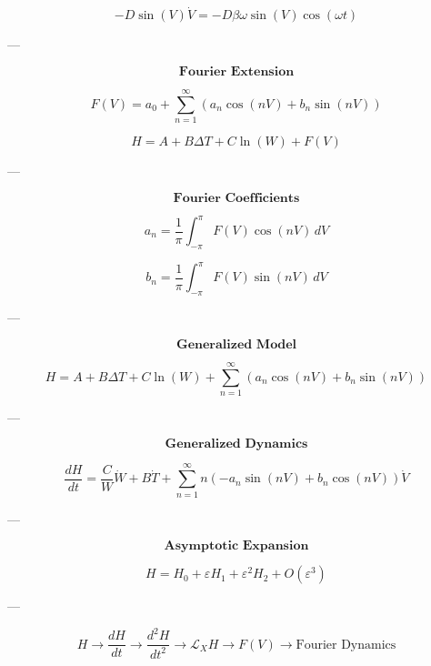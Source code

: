 \documentclass{article}
\begin{document}
\[
-D\sin(V)\dot V
=
-D\beta\omega
\sin(V)
\cos(\omega t)
\]

---

\[
\textbf{Fourier Extension}
\]

\[
F(V)
=
a_0
+
\sum_{n=1}^{\infty}
\left(
a_n\cos(nV)
+
b_n\sin(nV)
\right)
\]

\[
H
=
A
+
B\Delta T
+
C\ln(W)
+
F(V)
\]

---

\[
\textbf{Fourier Coefficients}
\]

\[
a_n
=
\frac1\pi
\int_{-\pi}^{\pi}
F(V)\cos(nV)\,dV
\]

\[
b_n
=
\frac1\pi
\int_{-\pi}^{\pi}
F(V)\sin(nV)\,dV
\]

---

\[
\textbf{Generalized Model}
\]

\[
H
=
A
+
B\Delta T
+
C\ln(W)
+
\sum_{n=1}^{\infty}
\left(
a_n\cos(nV)
+
b_n\sin(nV)
\right)
\]

---

\[
\textbf{Generalized Dynamics}
\]

\[
\boxed{
\frac{dH}{dt}
=
\frac{C}{W}\dot W
+
B\dot T
+
\sum_{n=1}^{\infty}
n
\left(
-a_n\sin(nV)
+
b_n\cos(nV)
\right)
\dot V
}
\]

---

\[
\textbf{Asymptotic Expansion}
\]

\[
H
=
H_0
+
\varepsilon H_1
+
\varepsilon^2H_2
+
O(\varepsilon^3)
\]

---

\[
\boxed{
H
\rightarrow
\frac{dH}{dt}
\rightarrow
\frac{d^2H}{dt^2}
\rightarrow
\mathcal L_XH
\rightarrow
F(V)
\rightarrow
\text{Fourier Dynamics}
}
\]
\end{document}

